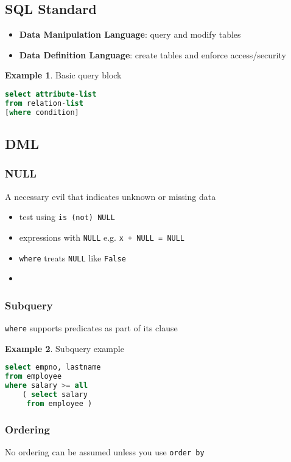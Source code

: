 \documentclass[]{article}
\theoremstyle{definition}
\newtheorem{ex}{Example}[section]
\begin{document}
		\subsection{SQL Standard}
			\begin{itemize}
				\item \textbf{Data Manipulation Language}: query and modify tables
				\item \textbf{Data Definition Language}: create tables and enforce access/security
			\end{itemize}	
			\begin{ex}
				Basic query block
				\begin{lstlisting}[language=SQL]
select attribute-list
from relation-list
[where condition]
				\end{lstlisting}
			\end{ex}			
		\subsection{DML}
			\subsubsection{NULL}
				A necessary evil that indicates unknown or missing data
				\begin{itemize}
					\item test using \lstinline|is (not) NULL|
					\item expressions with \lstinline|NULL| e.g. \lstinline|x + NULL = NULL|
					\item \lstinline|where| treats \lstinline|NULL| like \lstinline|False|
					\item  
				\end{itemize}
			\subsubsection{Subquery}
				\lstinline|where| supports predicates as part of its clause
				\begin{ex} Subquery example
					\begin{lstlisting}[language=SQL]
select empno, lastname
from employee
where salary >= all
 	( select salary
	 from employee )				
					\end{lstlisting}
				\end{ex}
			\subsubsection{Ordering}
				No ordering can be assumed unless you use \lstinline|order by|
				
\end{document}
